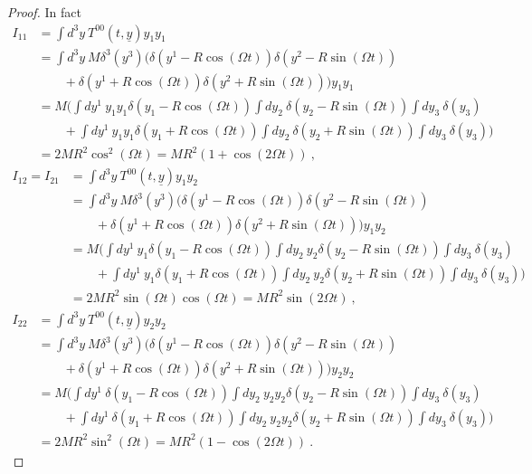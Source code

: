     \begin{proof}
        In fact 
        \begin{equation*}
        \begin{aligned}
            I_{11} & = \int d^3 y ~ T^{00} (t, \underline y) y_1 y_1 \\ & = \int d^3 y ~ M \delta^3 (y^3) \Big (\delta(y^1 - R \cos (\Omega t))\delta(y^2 - R \sin (\Omega t)) \\ & \qquad + \delta(y^1 + R \cos (\Omega t))\delta(y^2 + R \sin (\Omega t)) \Big ) y_1 y_1 \\ & = M \Big ( \int dy^1 ~ y_1 y_1 \delta (y_1 - R \cos (\Omega t)) \int dy_2 ~ \delta (y_2 - R \sin (\Omega t)) \int d y_3 ~ \delta (y_3) \\ & \qquad + \int dy^1 ~ y_1 y_1 \delta (y_1 + R \cos (\Omega t)) \int dy_2 ~ \delta (y_2 + R \sin (\Omega t)) \int d y_3 ~ \delta (y_3) \Big ) \\ & = 2 M R^2 \cos^2 (\Omega t) = M R^2 (1 + \cos (2 \Omega t)) ~,
        \end{aligned}
        \end{equation*}
        \begin{equation*}
        \begin{aligned}
            I_{12} = I_{21} & = \int d^3 y ~ T^{00} (t, \underline y) y_1 y_2 \\ & = \int d^3 y ~ M \delta^3 (y^3) \Big (\delta(y^1 - R \cos (\Omega t))\delta(y^2 - R \sin (\Omega t)) \\ & \qquad + \delta(y^1 + R \cos (\Omega t))\delta(y^2 + R \sin (\Omega t)) \Big ) y_1 y_2 \\ & = M \Big ( \int dy^1 ~ y_1 \delta (y_1 - R \cos (\Omega t)) \int dy_2 ~ y_2 \delta (y_2 - R \sin (\Omega t)) \int d y_3 ~ \delta (y_3) \\ & \qquad + \int dy^1 ~ y_1 \delta (y_1 + R \cos (\Omega t)) \int dy_2 ~ y_2 \delta (y_2 + R \sin (\Omega t)) \int d y_3 ~ \delta (y_3) \Big ) \\ & = 2 M R^2 \sin (\Omega t) \cos (\Omega t)  = M R^2 \sin (2 \Omega t) ~,
        \end{aligned}
        \end{equation*}
        \begin{equation*}
        \begin{aligned}
            I_{22} & = \int d^3 y ~ T^{00} (t, \underline y) y_2 y_2 \\ & = \int d^3 y ~ M \delta^3 (y^3) \Big (\delta(y^1 - R \cos (\Omega t))\delta(y^2 - R \sin (\Omega t)) \\ & \qquad + \delta(y^1 + R \cos (\Omega t))\delta(y^2 + R \sin (\Omega t)) \Big ) y_2 y_2 \\ & = M \Big ( \int dy^1 ~ \delta (y_1 - R \cos (\Omega t)) \int dy_2 ~ y_2 y_2 \delta (y_2 - R \sin (\Omega t)) \int d y_3 ~ \delta (y_3) \\ & \qquad + \int dy^1 ~ \delta (y_1 + R \cos (\Omega t)) \int dy_2 ~ y_2 y_2 \delta (y_2 + R \sin (\Omega t)) \int d y_3 ~ \delta (y_3) \Big ) \\ & = 2 M R^2 \sin^2 (\Omega t) = M R^2 (1 - \cos (2 \Omega t)) ~.

\end{aligned}
\end{equation*}
\end{proof}
